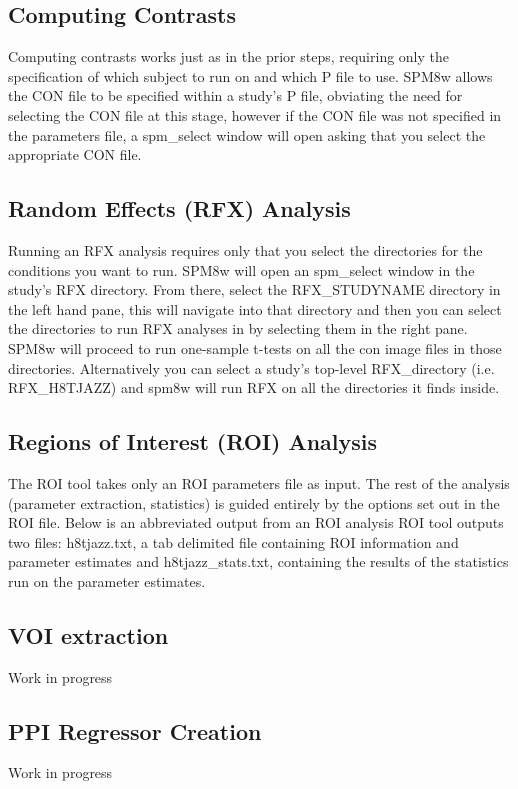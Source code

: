 \documentclass[12pt]{article}
\begin{document}
\subsection{Computing Contrasts}
Computing contrasts works just as in the prior steps, requiring only the specification of which subject to run on and which P file to use. SPM8w allows the CON file to be specified within a study’s P file, obviating the need for selecting the CON file at this stage, however if the CON file was not specified in the parameters file, a spm\_select window will open asking that you select the appropriate CON file.

\subsection{Random Effects (RFX) Analysis}
Running an RFX analysis requires only that you select the directories for the conditions you want to run. SPM8w will open an spm\_select window in the study’s RFX directory. From there, select the RFX\_STUDYNAME directory in the left hand pane, this will navigate into that directory and then you can select the directories to run RFX analyses in by selecting them in the right pane. SPM8w will proceed to run one-sample t-tests on all the con image files in those directories. Alternatively you can select a study’s top-level RFX\_directory (i.e. RFX\_H8TJAZZ) and spm8w will run RFX on all the directories it finds inside.

\subsection{Regions of Interest (ROI) Analysis}
The ROI tool takes only an ROI parameters file as input. The rest of the analysis (parameter extraction, statistics) is guided entirely by the options set out in the ROI file. Below is an abbreviated output from an ROI analysis
ROI tool outputs two files: h8tjazz.txt, a tab delimited file containing ROI information and parameter estimates and h8tjazz\_stats.txt, containing the results of the statistics run on the parameter estimates. 
\subsection{VOI extraction}
Work in progress
\subsection{PPI Regressor Creation}
Work in progress
\newpage
\end{document}
